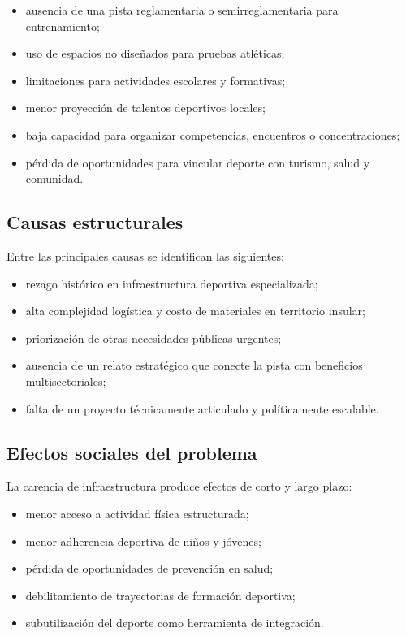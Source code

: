 \documentclass[12pt,letterpaper]{article}
\begin{document}
\begin{itemize}
    \item ausencia de una pista reglamentaria o semirreglamentaria para entrenamiento;
    \item uso de espacios no diseñados para pruebas atléticas;
    \item limitaciones para actividades escolares y formativas;
    \item menor proyección de talentos deportivos locales;
    \item baja capacidad para organizar competencias, encuentros o concentraciones;
    \item pérdida de oportunidades para vincular deporte con turismo, salud y comunidad.
\end{itemize}

\subsection{Causas estructurales}

Entre las principales causas se identifican las siguientes:

\begin{itemize}
    \item rezago histórico en infraestructura deportiva especializada;
    \item alta complejidad logística y costo de materiales en territorio insular;
    \item priorización de otras necesidades públicas urgentes;
    \item ausencia de un relato estratégico que conecte la pista con beneficios multisectoriales;
    \item falta de un proyecto técnicamente articulado y políticamente escalable.
\end{itemize}

\subsection{Efectos sociales del problema}

La carencia de infraestructura produce efectos de corto y largo plazo:

\begin{itemize}
    \item menor acceso a actividad física estructurada;
    \item menor adherencia deportiva de niños y jóvenes;
    \item pérdida de oportunidades de prevención en salud;
    \item debilitamiento de trayectorias de formación deportiva;
    \item subutilización del deporte como herramienta de integración.
\end{itemize}
\end{document}
